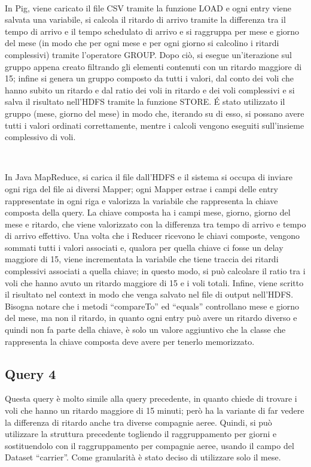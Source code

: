 \documentclass[11pt]{article} %
\begin{document}
~

In Pig, viene caricato il file CSV tramite la funzione LOAD e ogni entry viene salvata una variabile, si calcola il ritardo di arrivo tramite la differenza tra il tempo di arrivo e il tempo schedulato di arrivo e si raggruppa per mese e giorno del mese (in modo che per ogni mese e per ogni giorno si calcolino i ritardi complessivi) tramite l'operatore GROUP. Dopo ciò, si esegue un'iterazione sul gruppo appena creato filtrando gli elementi contenuti con un ritardo maggiore di 15; infine si genera un gruppo composto da tutti i valori, dal conto dei voli che hanno subito un ritardo e dal ratio dei voli in ritardo e dei voli complessivi e si salva il risultato nell'HDFS tramite la funzione STORE. \'E stato utilizzato il gruppo (mese, giorno del mese) in modo che, iterando su di esso, si possano avere tutti i valori ordinati correttamente, mentre i calcoli vengono eseguiti sull'insieme complessivo di voli. 

~

In Java MapReduce, si carica il file dall'HDFS e il sistema si occupa di inviare ogni riga del file ai diversi Mapper; ogni Mapper estrae i campi delle entry rappresentate in ogni riga e valorizza la variabile che rappresenta la chiave composta della query. La chiave composta ha i campi mese, giorno, giorno del mese e ritardo, che viene valorizzato con la differenza tra tempo di arrivo e tempo di arrivo effettivo. Una volta che i Reducer ricevono le chiavi composte, vengono sommati tutti i valori associati e, qualora per quella chiave ci fosse un delay maggiore di 15, viene incrementata la variabile che tiene traccia dei ritardi complessivi associati a quella chiave; in questo modo, si può calcolare il ratio tra i voli che hanno avuto un ritardo maggiore di 15 e i voli totali. Infine, viene scritto il risultato nel context in modo che venga salvato nel file di output nell'HDFS. Bisogna notare che i metodi ``compareTo'' ed ``equals'' controllano mese e giorno del mese, ma non il ritardo, in quanto ogni entry può avere un ritardo diverso e quindi non fa parte della chiave, è solo un valore aggiuntivo che la classe che rappresenta la chiave composta deve avere per tenerlo memorizzato. 

\subsection{Query 4}

Questa query è molto simile alla query precedente, in quanto chiede di trovare i voli che hanno un ritardo maggiore di 15 minuti; però ha la variante di far vedere la differenza di ritardo anche tra diverse compagnie aeree. Quindi, si può utilizzare la struttura precedente togliendo il raggruppamento per giorni e sostituendolo con il raggruppamento per compagnie aeree, usando il campo del Dataset ``carrier''.  Come granularità è stato deciso di utilizzare solo il mese.
\end{document}
